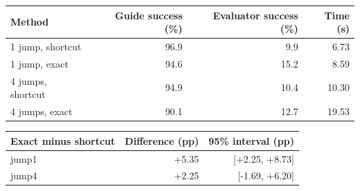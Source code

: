 \begin{tabular}{lrrr}
\hline
Method & Guide success (\%) & Evaluator success (\%) & Time (s) \\
\hline
1 jump, shortcut & 96.9 & 9.9 & 6.73 \\
1 jump, exact & 94.6 & 15.2 & 8.59 \\
4 jumps, shortcut & 94.9 & 10.4 & 10.30 \\
4 jumps, exact & 90.1 & 12.7 & 19.53 \\
\hline
\end{tabular}


\begin{tabular}{lrr}
\hline
Exact minus shortcut & Difference (pp) & 95\% interval (pp) \\
\hline
jump1 & +5.35 & [+2.25, +8.73] \\
jump4 & +2.25 & [-1.69, +6.20] \\
\hline
\end{tabular}
